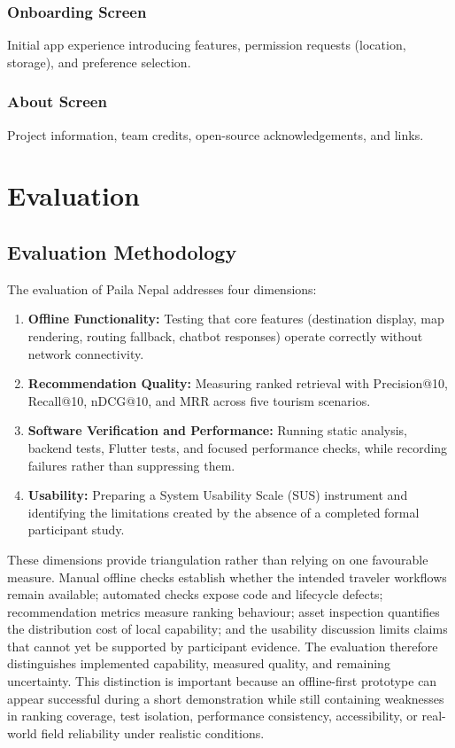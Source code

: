 \documentclass[12pt,a4paper,oneside]{report}
\begin{document}
\subsection{Onboarding Screen}

Initial app experience introducing features, permission requests (location, storage), and preference selection.

\subsection{About Screen}

Project information, team credits, open-source acknowledgements, and links.
\chapter{Evaluation}
\label{ch:evaluation}

\section{Evaluation Methodology}
\label{sec:eval_method}

The evaluation of Paila Nepal addresses four dimensions:

\begin{enumerate}
\item \textbf{Offline Functionality:} Testing that core features (destination display, map rendering, routing fallback, chatbot responses) operate correctly without network connectivity.

\item \textbf{Recommendation Quality:} Measuring ranked retrieval with Precision@10, Recall@10, nDCG@10, and MRR across five tourism scenarios.

\item \textbf{Software Verification and Performance:} Running static analysis, backend tests, Flutter tests, and focused performance checks, while recording failures rather than suppressing them.

\item \textbf{Usability:} Preparing a System Usability Scale (SUS) instrument and identifying the limitations created by the absence of a completed formal participant study.
\end{enumerate}

These dimensions provide triangulation rather than relying on one favourable measure. Manual offline checks establish whether the intended traveler workflows remain available; automated checks expose code and lifecycle defects; recommendation metrics measure ranking behaviour; asset inspection quantifies the distribution cost of local capability; and the usability discussion limits claims that cannot yet be supported by participant evidence. The evaluation therefore distinguishes implemented capability, measured quality, and remaining uncertainty. This distinction is important because an offline-first prototype can appear successful during a short demonstration while still containing weaknesses in ranking coverage, test isolation, performance consistency, accessibility, or real-world field reliability under realistic conditions.
\end{document}
